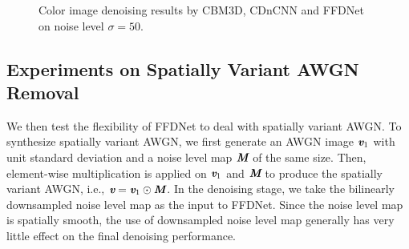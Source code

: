 \documentclass[journal]{IEEEtran}
\begin{document}
\begin{figure}[!tb]
\begin{center}

\caption{Color image denoising results by CBM3D, CDnCNN and FFDNet on noise level $\sigma = \text{50}$.}\label{fig5}
\end{center}%
\end{figure}



\subsection{Experiments on Spatially Variant AWGN Removal}
We then test the flexibility of FFDNet to deal with spatially variant AWGN. To synthesize spatially variant AWGN, we first generate an AWGN image $\emph{\textbf{v}}_1$ with unit standard deviation and a noise level map $\emph{\textbf{M}}$ of the same size. Then, element-wise multiplication is applied on $\emph{\textbf{v}}_1$ and $\emph{\textbf{M}}$ to produce the spatially variant AWGN, i.e., $\emph{\textbf{v}} = \emph{\textbf{v}}_1 \odot \emph{\textbf{M}}$.
In the denoising stage, we take the bilinearly downsampled noise level map as the input to FFDNet. Since the noise level map is spatially smooth, the use of downsampled noise level map generally has very little effect on the final denoising performance.
\end{document}

